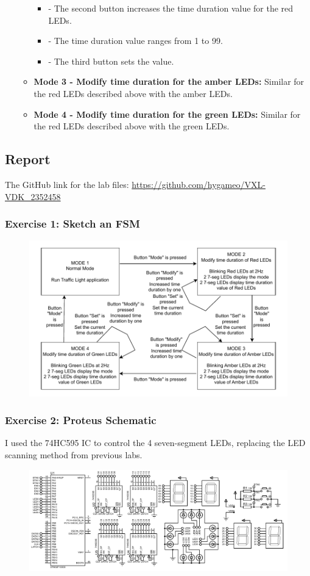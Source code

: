 \documentclass[a4paper,12pt]{article}
\begin{document}
\begin{itemize}
\begin{itemize}
\begin{itemize}
			\item[] - The second button increases the time duration value for the red LEDs.
			\item[] - The time duration value ranges from 1 to 99.
			\item[] - The third button sets the value.
		\end{itemize}
		\item[] \textbf{Mode 3 - Modify time duration for the amber LEDs:} Similar for the red LEDs described above with the amber LEDs.
		\item[] \textbf{Mode 4 - Modify time duration for the green LEDs:} Similar for the red LEDs described above with the green LEDs.
	\end{itemize}
\end{itemize}
\newpage
\subsection{Report}
The GitHub link for the lab files:
\textcolor{blue}{\url{https://github.com/hygameo/VXL-VDK_2352458}}
\subsubsection{Exercise 1: Sketch an FSM}
\label{ex1r1}
\begin{figure}[H]
    \centering
    \includegraphics[width=0.95\linewidth]{Attachments/1.2.PDF}
\end{figure}
\subsubsection{Exercise 2: Proteus Schematic}
I used the 74HC595 IC to control the 4 seven-segment LEDs, replacing the LED scanning method from previous labs.
\label{ex2r1}
\begin{figure}[H]
	\centering
	\includegraphics[width=0.95\linewidth]{Attachments/1.2.1.PDF}
\end{figure}
\newpage
\end{document}
